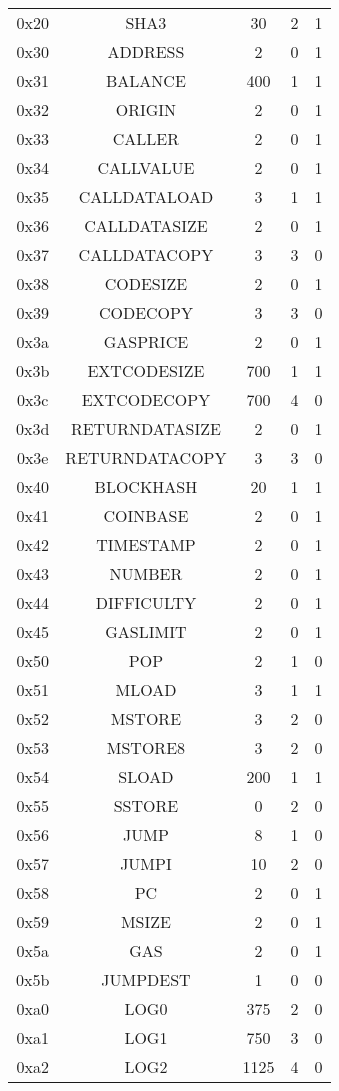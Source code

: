 \documentclass[11pt,a4paper,leqno,bibliography=totoc]{scrartcl}
\newenvironment{alphafootnotes}
{\par\edef\savedfootnotenumber{\number\value{footnote}}
\renewcommand{\thefootnote}{\alph{footnote}}
\setcounter{footnote}{0}}
{\par\setcounter{footnote}{\savedfootnotenumber}}
\begin{document}
\begin{alphafootnotes}
\begin{multicols*}{2}
\begin{multicols}{2}
{\begin{supertabular}{|ccccc|}
0x20 & SHA3 & 30 & 2 & 1 \\
0x30 & ADDRESS & 2 & 0 & 1 \\
0x31 & BALANCE & 400 & 1 & 1 \\
0x32 & ORIGIN & 2 & 0 & 1 \\
0x33 & CALLER & 2 & 0 & 1 \\
0x34 & CALLVALUE & 2 & 0 & 1 \\
0x35 & CALLDATALOAD & 3 & 1 & 1 \\
0x36 & CALLDATASIZE & 2 & 0 & 1 \\
0x37 & CALLDATACOPY & 3 & 3 & 0 \\
0x38 & CODESIZE & 2 & 0 & 1 \\
0x39 & CODECOPY & 3 & 3 & 0 \\
0x3a & GASPRICE & 2 & 0 & 1 \\
0x3b & EXTCODESIZE & 700 & 1 & 1 \\
0x3c & EXTCODECOPY & 700 & 4 & 0 \\
0x3d & RETURNDATASIZE & 2 & 0 & 1 \\
0x3e & RETURNDATACOPY & 3 & 3 & 0 \\
0x40 & BLOCKHASH & 20 & 1 & 1 \\
0x41 & COINBASE & 2 & 0 & 1 \\
0x42 & TIMESTAMP & 2 & 0 & 1 \\
0x43 & NUMBER & 2  & 0 & 1 \\
0x44 & DIFFICULTY & 2 & 0 & 1 \\
0x45 & GASLIMIT & 2  & 0 & 1 \\
0x50 & POP & 2 & 1 & 0 \\
0x51 & MLOAD & 3 & 1 & 1 \\
0x52 & MSTORE & 3 & 2 & 0 \\
0x53 & MSTORE8 & 3 & 2 & 0 \\
0x54 & SLOAD & 200 & 1 & 1 \\
0x55 & SSTORE & 0 & 2 & 0 \\
0x56 & JUMP & 8 & 1 & 0 \\
0x57 & JUMPI & 10 & 2 & 0 \\
0x58 & PC & 2 & 0 & 1 \\
0x59 & MSIZE & 2 & 0 & 1 \\
0x5a & GAS & 2 & 0 & 1 \\
0x5b & JUMPDEST & 1 & 0 & 0 \\
0xa0 & LOG0 & 375 & 2 & 0 \\
0xa1 & LOG1 & 750 & 3 & 0 \\
0xa2 & LOG2 & 1125 & 4 & 0 \\

\end{supertabular}}
\end{multicols}
\end{multicols*}
\end{alphafootnotes}
\end{document}
